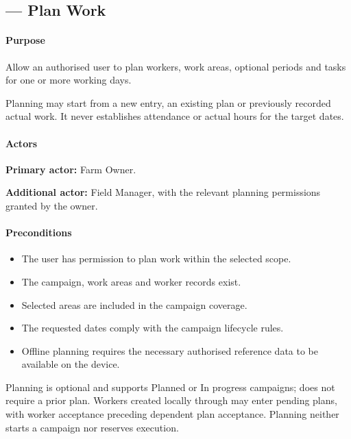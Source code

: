\subsection{ --- Plan Work}
\label{uc:08}

\paragraph{Purpose}

Allow an authorised user to plan workers,
work areas, optional periods and tasks
for one or more working days.

Planning may start from a new entry,
an existing plan or previously recorded actual work.
It never establishes attendance or actual hours
for the target dates.


\paragraph{Actors}

\textbf{Primary actor:} Farm Owner.

\textbf{Additional actor:} Field Manager,
with the relevant planning permissions granted by the owner.

\paragraph{Preconditions}

\begin{itemize}
    \item The user has permission to plan work
    within the selected scope.
    \item The campaign, work areas
    and worker records exist.
    \item Selected areas are included
    in the campaign coverage.
    \item The requested dates comply
    with the campaign lifecycle rules.
    \item Offline planning requires
    the necessary authorised reference data
    to be available on the device.
\end{itemize}

Planning is optional and supports Planned or In progress campaigns;  does
not require a prior plan. Workers created locally through  may enter pending
plans, with worker acceptance preceding dependent plan acceptance. Planning neither
starts a campaign nor reserves execution.


